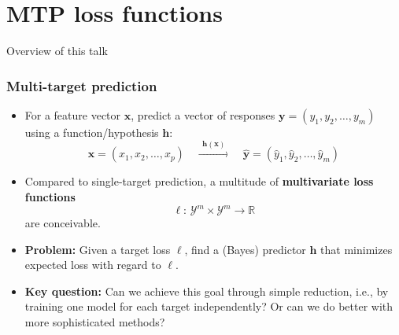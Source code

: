 \documentclass[]{beamer}
\newcommand{\bx}{\boldsymbol{x}}
\newcommand{\by}{\boldsymbol{y}}
\newcommand{\bh}{\boldsymbol{h}}
\renewcommand{\emph}[1]{\textbf{\color{putblue}#1}}
\begin{document}
\section{MTP loss functions}

\begin{frame}{Overview of this talk}

\tableofcontents

\end{frame}


\begin{frame}
\frametitle{Multi-target prediction}
\begin{itemize}
\item For a feature vector $\bx$, predict a vector of responses $\by = (y_1, y_2, \ldots, y_m)$ using a function/hypothesis $\bh$:
$$
\bx = (x_1,x_2,\ldots,x_p) \quad \xrightarrow{~~\bh(\bx)~~} \quad \hat{\by} = ( \hat{y}_1, \hat{y}_2, \ldots, \hat{y}_m)
$$
\pause

\item Compared to single-target prediction, a multitude of \emph{multivariate loss functions} 
$$
\ell: \, \mathcal{Y}^m \times \mathcal{Y}^m \rightarrow \mathbb{R}
$$ 
are conceivable. 
\pause

\item \emph{Problem:} Given a target loss $\ell$, find a (Bayes) predictor $\bh$ that minimizes expected loss with regard to $\ell$. 
\pause

\item \emph{Key question:} Can we achieve this goal through simple reduction, i.e., by training one model for each target independently? Or can we do better with more sophisticated methods?  


\end{itemize}

\end{frame}
\end{document}
